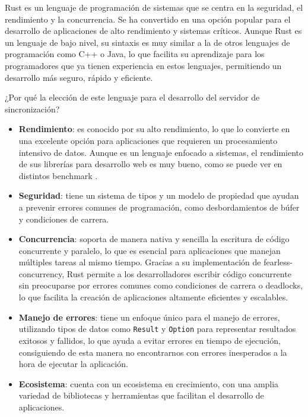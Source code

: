 Rust es un lenguaje de programación de sistemas que se centra en la seguridad, el rendimiento y la concurrencia. Se ha convertido en una opción popular para el desarrollo de aplicaciones de alto rendimiento y sistemas críticos.
Aunque Rust es un lenguaje de bajo nivel, su sintaxis es muy similar a la de otros lenguajes de programación como C++ o Java, lo que facilita su aprendizaje para los programadores que ya tienen experiencia en estos lenguajes, permitiendo un desarrollo más seguro, rápido y eficiente. 

¿Por qué la elección de este lenguaje para el desarrollo del servidor de sincronización? \parencite{rust-for-safety-and-performance}
\begin{itemize}
    \item \textbf{Rendimiento}: es conocido por su alto rendimiento, lo que lo convierte en una excelente opción para aplicaciones que requieren un procesamiento intensivo de datos. Aunque es un lenguaje enfocado a sistemas, el rendimiento de sus librerías para desarrollo web es muy bueno, como se puede ver en distintos benchmark \parencite{rust-benchmark}.
    \item \textbf{Seguridad}: tiene un sistema de tipos y un modelo de propiedad que ayudan a prevenir errores comunes de programación, como desbordamientos de búfer y condiciones de carrera.
    \item \textbf{Concurrencia}: soporta de manera nativa y sencilla la escritura de código concurrente y paralelo, lo que es esencial para aplicaciones que manejan múltiples tareas al mismo tiempo.
        Gracias a su implementación de \gls{fearless-concurrency}, Rust permite a los desarrolladores escribir código concurrente sin preocuparse por errores comunes como condiciones de carrera o deadlocks, lo que facilita la creación de aplicaciones altamente eficientes y escalables.
    \item \textbf{Manejo de errores}: tiene un enfoque único para el manejo de errores, utilizando tipos de datos como \texttt{Result} y \texttt{Option} para representar resultados exitosos y fallidos, lo que ayuda a evitar errores en tiempo de ejecución, consiguiendo de esta manera no encontrarnos con errores inesperados a la hora de ejecutar la aplicación.
    \item \textbf{Ecosistema}: cuenta con un ecosistema en crecimiento, con una amplia variedad de bibliotecas y herramientas que facilitan el desarrollo de aplicaciones.
\end{itemize}


